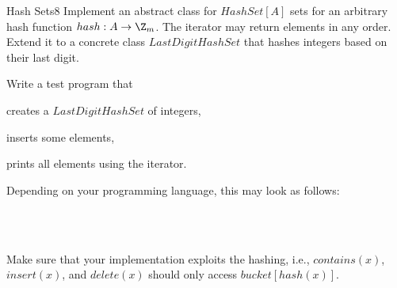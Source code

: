 \documentclass[a4paper]{article}
\begin{document}
\begin{problem}{Hash Sets}{8}
Implement an abstract class for $HashSet[A]$ sets for an arbitrary hash function $hash:A\to \Z_m$.
The iterator may return elements in any order.
Extend it to a concrete class $LastDigitHashSet$ that hashes integers based on their last digit.

Write a test program that
\begin{compactitem}
\item creates a $LastDigitHashSet$ of integers,
\item inserts some elements,
\item prints all elements using the iterator.
\end{compactitem}

Depending on your programming language, this may look as follows:
\begin{acode}
\\\\
\end{acode}

Make sure that your implementation exploits the hashing, i.e., $contains(x)$, $insert(x)$, and $delete(x)$ should only access $bucket[hash(x)]$.
\end{problem}
\end{document}
